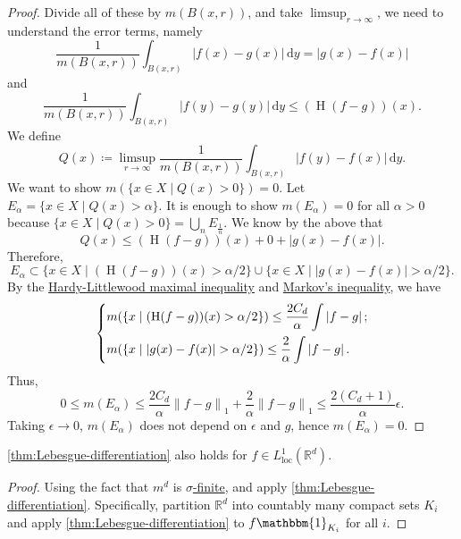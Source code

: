 \begin{proof}
	Divide all of these by \(m(B(x, r))\), and take \(\limsup_{r \to \infty} \), we need to understand the error terms, namely
	\[
		\frac{1}{m(B(x, r))}\int _{B(x, r)}\left\vert f(x) - g(x) \right\vert \,\mathrm{d} y = \left\vert g(x) - f(x) \right\vert
	\]
	and
	\[
		\frac{1}{m(B(x, r))}\int _{B(x, r)}\left\vert f(y) - g(y) \right\vert \,\mathrm{d} y \leq (\operatorname{H} (f-g))(x).
	\]
	We define
	\[
		Q(x) \coloneqq \limsup_{r \to \infty} \frac{1}{m(B(x, r))}\int _{B(x, r)} \left\vert f(y) - f(x) \right\vert \,\mathrm{d} y.
	\]
	We want to show \(m(\{x\in X\mid Q(x) > 0\}) = 0\). Let \(E_\alpha = \{x\in X\mid Q(x) > \alpha \}\). It is enough to show \(m(E_\alpha ) = 0\) for all \(\alpha >0\) because \(\{x\in X\mid Q(x)> 0\}= \bigcup_n E_{\frac{1}{n}}\). We know by the above that
	\[
		Q(x) \leq (\operatorname{H} (f-g))(x) + 0 + \left\vert g(x) - f(x) \right\vert.
	\]
	Therefore,
	\[
		E_\alpha \subset \{x\in X\mid (\operatorname{H} (f-g))(x) > \alpha /2\}\cup \{x\in X\mid \left\vert g(x) - f(x) \right\vert >\alpha /2\}.
	\]
	By the \hyperref[thm:HL-maximal-inequality]{Hardy-Littlewood maximal inequality} and \hyperref[lma:Markov-inequality]{Markov's inequality}, we have
	\[
		\begin{dcases}
			m(\left\{x\mid (\operatorname{H}(f-g))(x) > \alpha / 2\right\})                \leq \frac{2C_{d} }{\alpha }\int \left\vert f - g \right\vert; \\
			m(\left\{x\mid \left\vert g(x) - f(x) \right\vert > \alpha / 2\right\})  \leq \frac{2}{\alpha }\int \left\vert f - g \right\vert.
		\end{dcases}
	\]
	Thus,
	\[
		0\leq m(E_\alpha )\leq \frac{2C_d}{\alpha }\left\lVert f-g\right\rVert _1 + \frac{2}{\alpha }\left\lVert f-g\right\rVert _1 \leq \frac{2(C_{d} +1)}{\alpha }\epsilon.
	\]
	Taking \(\epsilon \to 0\), \(m(E_\alpha )\) does not depend on \(\epsilon \) and \(g\), hence \(m(E_\alpha) = 0\).
\end{proof}

\begin{corollary}\label{col:lec-22-1}
	\autoref{thm:Lebesgue-differentiation} also holds for \(f\in L^1_{\text{loc}}(\mathbb{R} ^d)\).
\end{corollary}
\begin{proof}
	Using the fact that \(m^d\) is \hyperref[def:finite-measure]{\(\sigma \)-finite}, and apply \autoref{thm:Lebesgue-differentiation}. Specifically, partition \(\mathbb{R} ^d\) into countably many compact sets \(K_{i} \) and apply \autoref{thm:Lebesgue-differentiation} to \(f\mathbbm{1}_{K_{i} } \) for all \(i\).
\end{proof}

